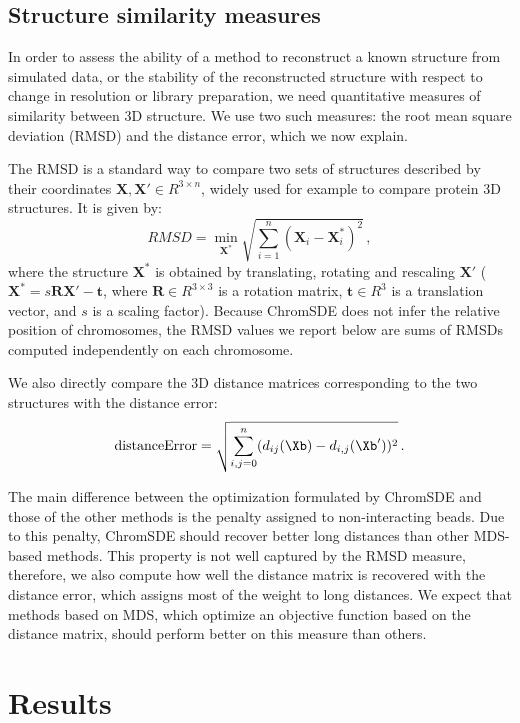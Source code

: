 \subsection{Structure similarity measures}
In order to assess the ability of a method to reconstruct a known
structure from simulated data, or the stability of the reconstructed structure with respect to change in resolution or library preparation, we need quantitative measures of similarity between 3D structure. We use two such measures: the root mean square deviation (RMSD) and the distance error, which we now explain.

The RMSD is a
standard way to compare two sets of structures described by their
coordinates $\mathbf{X}, \mathbf{X}' \in R^{3 \times n}$, widely used for example to compare protein 3D structures. It is given by:
\begin{equation*}
RMSD = \min_{\mathbf{X}^*} \sqrt{\sum_{i = 1}^n (\mathbf{X}_{i} -
  \mathbf{X}_{i}^*)^2} \,,
\end{equation*}
where the structure $\mathbf{X}^*$ is obtained by translating,
rotating and rescaling $\mathbf{X}'$ ($\mathbf{X}^* = s \mathbf{R X'} -
\mathbf{t}$, where $\mathbf{R} \in R^{3 \times 3}$ is a rotation
matrix, $\mathbf{t} \in R^{3}$ is a translation vector, and $s$ is a
scaling factor). Because ChromSDE
does not infer the relative position of chromosomes, the RMSD values we report below
are sums of RMSDs computed independently on each chromosome.

We also directly compare the 3D distance matrices corresponding to the two structures with the distance error:
\begin{equation*}
\text{distanceError} = \sqrt{\sum_{i, j = 0}^n (d_{ij}(\Xb) - d_{i, j}(\Xb'))^2} \,.
\end{equation*}


The main difference between the optimization formulated by ChromSDE
and those of the other methods is the penalty assigned to
non-interacting beads.  Due to this penalty, ChromSDE should recover
better long distances than other MDS-based methods.  This property is
not well captured by the RMSD measure, therefore, we also compute how
well the distance matrix is recovered with the distance error, which assigns most of the weight to long distances. We
expect that methods based on MDS, which optimize an objective function
based on the distance matrix, should perform better on this measure
than others.

\section{Results}

